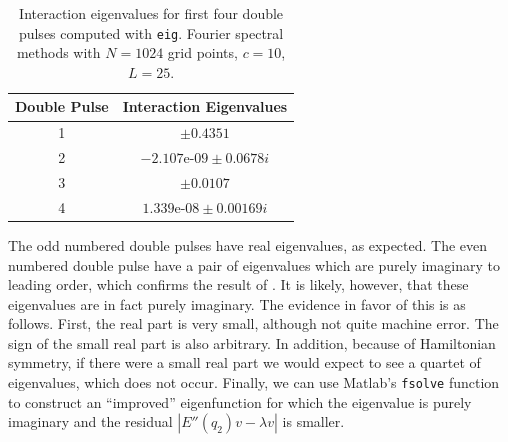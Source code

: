 \documentclass[thesis2.tex]{subfiles}
\begin{document}
\begin{table}
\centering
\begin{tabular}{|c|c|} 
 \hline
 Double Pulse & Interaction Eigenvalues \\
 \hline
 1 & $\pm 0.4351$ \\
 2 & $-2.107\text{e-}09 \pm 0.0678 i$ \\
 3 & $\pm 0.0107$ \\
 4 & $1.339\text{e-}08 \pm 0.00169 i$ \\
 \hline
\end{tabular}
\caption[Interaction eigenvalues for double pulses for KdV5]{Interaction eigenvalues for first four double pulses computed with \texttt{eig}. Fourier spectral methods with $N = 1024$ grid points, $c = 10$, $L = 25$.}
\label{table:KdV5inteigs}
\end{table}

The odd numbered double pulses have real eigenvalues, as expected. The even numbered double pulse have a pair of eigenvalues which are purely imaginary to leading order, which confirms the result of \cite[Theorem 2.3]{Pelinovsky2007}. It is likely, however, that these eigenvalues are in fact purely imaginary. The evidence in favor of this is as follows. First, the real part is very small, although not quite machine error. The sign of the small real part is also arbitrary. In addition, because of Hamiltonian symmetry, if there were a small real part we would expect to see a quartet of eigenvalues, which does not occur. Finally, we can use Matlab's \texttt{fsolve} function to construct an ``improved'' eigenfunction for which the eigenvalue is purely imaginary and the residual $|E''(q_2)v - \lambda v|$ is smaller.
\end{document}
